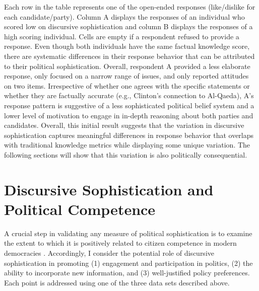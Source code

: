 Each row in the table represents one of the open-ended responses (like/dislike for each candidate/party). Column A displays the responses of an individual who scored low on discursive sophistication and column B displays the responses of a high scoring individual. Cells are empty if a respondent refused to provide a response. Even though both individuals have the same factual knowledge score, there are systematic differences in their response behavior that can be attributed to their political sophistication. Overall, respondent A provided a less elaborate response, only focused on a narrow range of issues, and only reported attitudes on two items. Irrespective of whether one agrees with the specific statements or whether they are factually accurate (e.g., Clinton's connection to Al-Qaeda), A's response pattern is suggestive of a less sophisticated political belief system and a lower level of motivation to engage in in-depth reasoning about both parties and candidates. Overall, this initial result suggests that the variation in discursive sophistication captures meaningful differences in response behavior that overlaps with traditional knowledge metrics while displaying some unique variation. The following sections will show that this variation is also politically consequential.



\section*{Discursive Sophistication and Political Competence}

A crucial step in validating any measure of political sophistication is to examine the extent to which it is positively related to citizen competence in modern democracies \citep[cf.][]{lupia2006elitism,lupia2015uninformed}. Accordingly, I consider the potential role of discursive sophistication in promoting (1) engagement and participation in politics, (2) the ability to incorporate new information, and (3) well-justified policy preferences. Each point is addressed using one of the three data sets described above.


